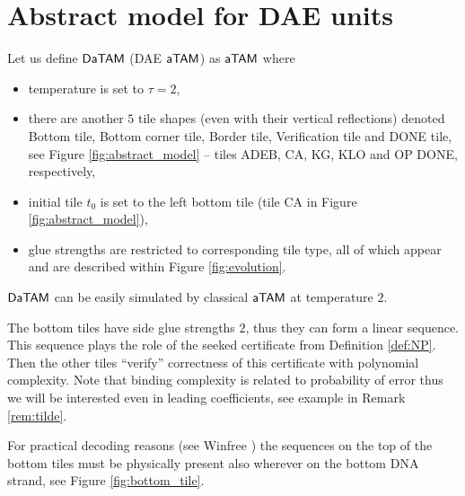 \section{Abstract model for DAE units}

\begin{defn}
	Let us define $\mathsf{DaTAM}$ (DAE $\mathsf{aTAM}$) as $\mathsf{aTAM}$ where
	\begin{itemize}
		\item temperature is set to $\tau = 2$,
		\item there are another $5$ tile shapes (even with their vertical reflections) denoted Bottom tile, Bottom corner tile, Border tile, Verification tile and DONE tile, see Figure \ref{fig:abstract_model} -- tiles {\sf ADEB}, {\sf CA}, {\sf KG}, {\sf KLO} and {\sf OP DONE}, respectively,
		\item initial tile $t_0$ is set to the left bottom tile (tile {\sf CA} in Figure \ref{fig:abstract_model}),
		\item glue strengths are restricted to corresponding tile type, all of which appear and are described within Figure \ref{fig:evolution}.
	\end{itemize}
\end{defn}

\begin{note}
	$\mathsf{DaTAM}$ can be easily simulated by classical $\mathsf{aTAM}$ at temperature $2$.   %
\end{note}

The bottom tiles have side glue strengths $2$, thus they can form a linear sequence. This sequence plays the role of the seeked certificate from Definition \ref{def:NP}. Then the other tiles ``verify'' correctness of this certificate with polynomial complexity. Note that binding complexity is related to probability of error thus we will be interested even in leading coefficients, see example in Remark \ref{rem:tilde}.

For practical decoding reasons (see Winfree \cite{winfree_phd}) the sequences on the top of the bottom tiles must be physically present also wherever on the bottom DNA strand, see Figure \ref{fig:bottom_tile}.

